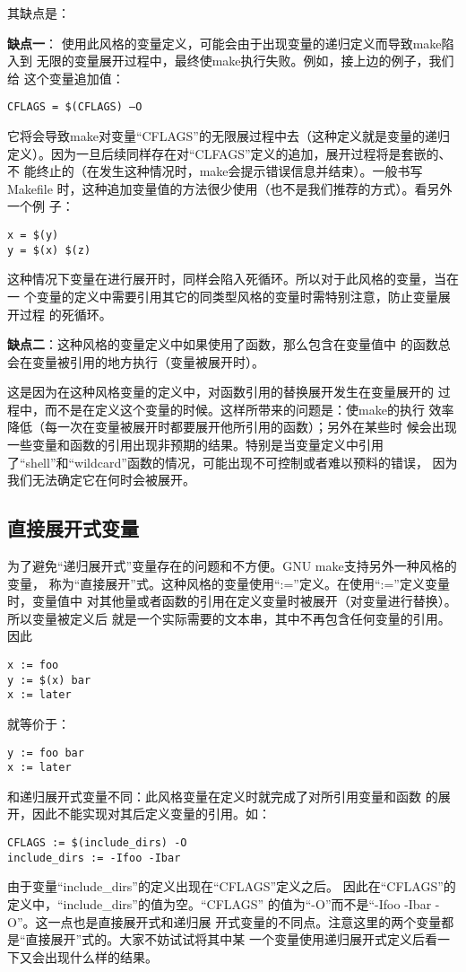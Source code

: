 其缺点是：

   \textbf{缺点一}： 使用此风格的变量定义，可能会由于出现变量的递归定义而导致make陷入到
      无限的变量展开过程中，最终使make执行失败。例如，接上边的例子，我们给
      这个变量追加值：
\begin{Verbatim}[]
CFLAGS = $(CFLAGS) –O
\end{Verbatim}

      它将会导致make对变量“CFLAGS”的无限展过程中去（这种定义就是变量的递归
  定义）。因为一旦后续同样存在对“CLFAGS”定义的追加，展开过程将是套嵌的、不
  能终止的（在发生这种情况时，make会提示错误信息并结束）。一般书写Makefile
  时，这种追加变量值的方法很少使用（也不是我们推荐的方式）。看另外一个例
  子：
\begin{Verbatim}[]
x = $(y)
y = $(x) $(z)
\end{Verbatim}

这种情况下变量在进行展开时，同样会陷入死循环。所以对于此风格的变量，当在一
个变量的定义中需要引用其它的同类型风格的变量时需特别注意，防止变量展开过程
的死循环。

    \textbf{缺点二}：这种风格的变量定义中如果使用了函数，那么包含在变量值中
      的函数总会在变量被引用的地方执行（变量被展开时）。

      这是因为在这种风格变量的定义中，对函数引用的替换展开发生在变量展开的
      过程中，而不是在定义这个变量的时候。这样所带来的问题是：使make的执行
      效率降低（每一次在变量被展开时都要展开他所引用的函数）；另外在某些时
      候会出现一些变量和函数的引用出现非预期的结果。特别是当变量定义中引用
      了“shell”和“wildcard”函数的情况，可能出现不可控制或者难以预料的错误，
      因为我们无法确定它在何时会被展开。

\subsection{直接展开式变量}
为了避免“递归展开式”变量存在的问题和不方便。GNU make支持另外一种风格的变量，
称为“直接展开”式。这种风格的变量使用“:=”定义。在使用“:=”定义变量时，变量值中
对其他量或者函数的引用在定义变量时被展开（对变量进行替换）。所以变量被定义后
就是一个实际需要的文本串，其中不再包含任何变量的引用。因此
\begin{Verbatim}[]
x := foo
y := $(x) bar
x := later
\end{Verbatim}
\noindent 就等价于：
\begin{Verbatim}[]
y := foo bar
x := later
\end{Verbatim}
\noindent 和递归展开式变量不同：此风格变量在定义时就完成了对所引用变量和函数
的展开，因此不能实现对其后定义变量的引用。如：
\begin{Verbatim}[]
CFLAGS := $(include_dirs) -O
include_dirs := -Ifoo -Ibar
\end{Verbatim}
\noindent 由于变量“include\_dirs”的定义出现在“CFLAGS”定义之后。
因此在“CFLAGS”的定义中，“include\_dirs”的值为空。“CFLAGS”
的值为“-O”而不是“-Ifoo -Ibar -O”。这一点也是直接展开式和递归展
开式变量的不同点。注意这里的两个变量都是“直接展开”式的。大家不妨试试将其中某
一个变量使用递归展开式定义后看一下又会出现什么样的结果。

